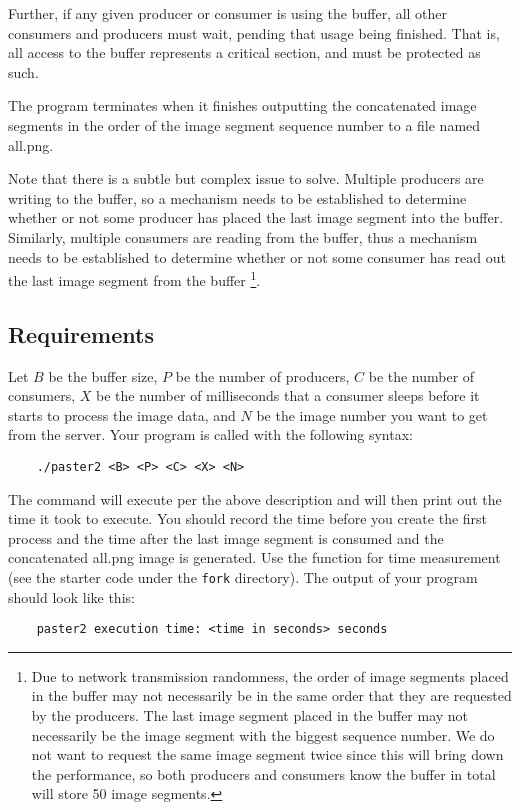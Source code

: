 Further, if any given producer or consumer is using the buffer, all other consumers and producers must wait, pending that usage being finished.  That is, all access to the buffer represents a critical section, and must be protected as such.

The program terminates when it finishes outputting the concatenated image segments in the order of the image segment sequence number to a file named all.png.

Note that there is a subtle but complex issue to solve. Multiple producers are writing to the buffer, so a mechanism needs to be established to determine whether or not some producer has placed the last image segment into the buffer. Similarly, multiple consumers are reading from the buffer, thus a mechanism needs to be established to determine whether or not some consumer has read out the last image segment from the buffer
\footnote{Due to network transmission randomness, the order of image segments placed in the buffer may not necessarily be in the same order that they are requested by the producers. The last image segment placed in the buffer may not necessarily be the image segment with the biggest sequence number. We do not want to request the same image segment twice since this will bring down the performance, so both producers and consumers know the buffer in total will store 50 image segments.}. 

\subsection*{Requirements}

Let
$B$ be the buffer size,  
$P$ be the number of producers,
$C$ be the number of consumers,
$X$ be the number of milliseconds that a consumer sleeps before it starts to process the image data, and
$N$ be the image number you want to get from the server.
Your program is called with the following syntax:
\begin{verbatim}
    ./paster2 <B> <P> <C> <X> <N>
\end{verbatim}

The command will execute per the above description and will then print out the time it took to execute. You should record the time before you create the first process and the time after the last image segment is consumed and the concatenated all.png image is generated. Use the  function for time measurement (see the starter code under the \verb+fork+ directory). 
The output of your program should look like this:
\begin{verbatim}
    paster2 execution time: <time in seconds> seconds
\end{verbatim}



